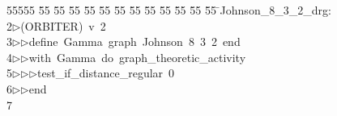 %
%
\begin{tabbing}
55555 \= 55 \= 55 \= 55 \= 55 \= 55 \= 55 \= 55 \= 55 \= 55 \= 55 \= 55 \= 55 \= \>Johnson\_8\_3\_2\_drg:\\[0pt]
2\>$\triangleright$\>(ORBITER)\ v\ 2\ \\[0pt]
3\>$\triangleright$\>$\triangleright$\>define\ Gamma\ graph\ Johnson\ 8\ 3\ 2\ end\ \\[0pt]
4\>$\triangleright$\>$\triangleright$\>with\ Gamma\ do\ graph\_theoretic\_activity\ \\[0pt]
5\>$\triangleright$\>$\triangleright$\>$\triangleright$\>test\_if\_distance\_regular\ 0\ \\[0pt]
6\>$\triangleright$\>$\triangleright$\>end\\[0pt]
7\>\end{tabbing}
